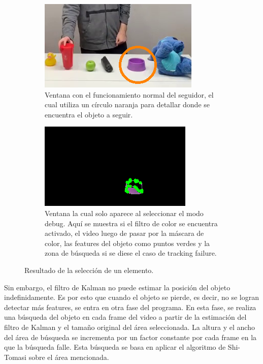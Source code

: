 \begin{figure}[H]
\centering
	\begin{subfigure}{.4\textwidth}
		\centering
		\includegraphics[width=\textwidth]{Imagenes/Optical1.png}
		\caption{Ventana con el funcionamiento normal del seguidor, el cual utiliza un círculo naranja para detallar donde se encuentra el objeto a seguir.}
		\label{fig:optical1}
	\end{subfigure}
	\begin{subfigure}{.4\textwidth}
		\centering
		\includegraphics[width=\textwidth]{Imagenes/Optical2.png}
		\caption{Ventana la cual solo aparece al seleccionar el modo debug. Aquí se muestra si el filtro de color se encuentra activado, el video luego de pasar por la máscara de color, las features del objeto como puntos verdes y la zona de búsqueda si se diese el caso de tracking failure.}
		\label{fig:optical2}
	\end{subfigure}
	\caption{Resultado de la selección de un elemento.}
	\label{fig:optical12}
\end{figure}

Sin embargo, el filtro de Kalman no puede estimar la posición del objeto indefinidamente. Es por esto que cuando el objeto se pierde, es decir, no se logran detectar más features, se entra en otra fase del programa. En esta fase, se realiza una búsqueda del objeto en cada frame del video a partir de la estimación del filtro de Kalman y el tamaño original del área seleccionada. La altura y el ancho del área de búsqueda se incrementa por un factor constante por cada frame en la que la búsqueda falle. Esta búsqueda se basa en aplicar el algoritmo de Shi-Tomasi sobre el área mencionada.

